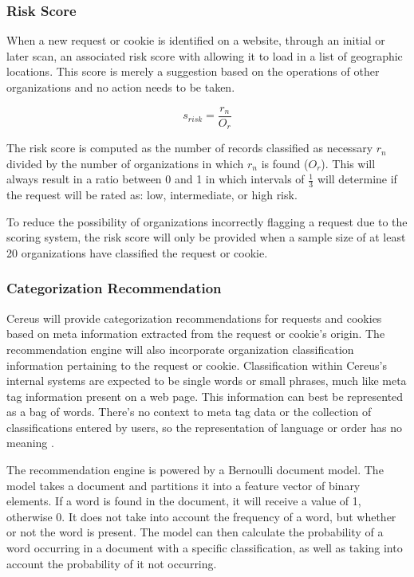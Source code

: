 \subsubsection*{Risk Score}

When a new request or cookie is identified on a website, through an initial or later scan, an associated risk score with allowing it to load in a list of geographic locations. This score is merely a suggestion based on the operations of other organizations and no action needs to be taken.

\[ s_{risk} = \frac{r_n}{O_r} \]

The risk score is computed as the number of records classified as necessary \( r_n \) divided by the number of organizations in which \(r_n\) is found (\( O_r \)). This will always result in a ratio between 0 and 1 in which intervals of \(\frac{1}{3}\) will determine if the request will be rated as: low, intermediate, or high risk.

To reduce the possibility of organizations incorrectly flagging a request due to the scoring system, the risk score will only be provided when a sample size of at least 20 organizations have classified the request or cookie.

\subsubsection*{Categorization Recommendation}

Cereus will provide categorization recommendations for requests and cookies based on meta information extracted from the request or cookie's origin. The recommendation engine will also incorporate organization classification information pertaining to the request or cookie. Classification within Cereus's internal systems are expected to be single words or small phrases, much like meta tag information present on a web page. This information can best be represented as a bag of words. There's no context to meta tag data or the collection of classifications entered by users, so the representation of language or order has no meaning \cite{manning.2008}.

The recommendation engine is powered by a Bernoulli document model. The model takes a document and partitions it into a feature vector of binary elements. If a word is found in the document, it will receive a value of 1, otherwise 0. It does not take into account the frequency of a word, but whether or not the word is present. The model can then calculate the probability of a word occurring in a document with a specific classification, as well as taking into account the probability of it not occurring.

